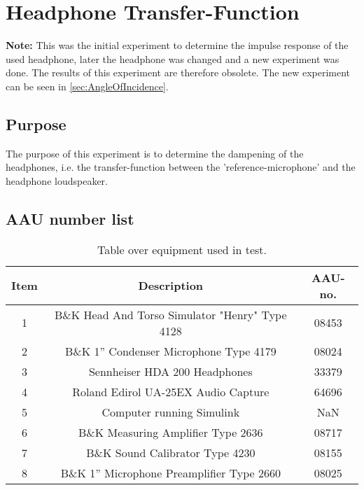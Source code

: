 \section{Headphone Transfer-Function} \label{sec:HPjournal}
\textbf{Note:} This was the initial experiment to determine the impulse response of the used headphone, later the headphone was changed and a new experiment was done. The results of this experiment are therefore obsolete. The new experiment can be seen in \autoref{sec:AngleOfIncidence}.
\subsection{Purpose}
The purpose of this experiment is to determine the dampening of the headphones, i.e. the transfer-function between the 'reference-microphone' and the headphone loudspeaker.

\subsection{AAU number list}
\begin{table}[H]
	\centering
	\begin{tabular}{ c c c } \toprule
		{Item}	& {Description} 						& {AAU-no}. \\ \bottomrule 
		1	&	B\&K Head And Torso Simulator "Henry" Type 4128	& 08453		\\
		2	&	B\&K 1'' Condenser Microphone Type 4179 & 08024\\
		3	&	Sennheiser HDA 200	Headphones			& 33379		\\
		4	&	Roland Edirol UA-25EX Audio Capture		& 64696		\\
		5	&	Computer running Simulink					& NaN		\\
		6	&	B\&K Measuring Amplifier Type 2636	& 08717		\\
		7	&	B\&K Sound Calibrator Type 4230			& 08155		\\ 
		8	&	B\&K 1'' Microphone Preamplifier Type 2660	& 08025		\\
		\bottomrule
	\end{tabular}
	\caption{Table over equipment used in test.}
	\label{tab:UsedEquipmentListningHP}
\end{table}

